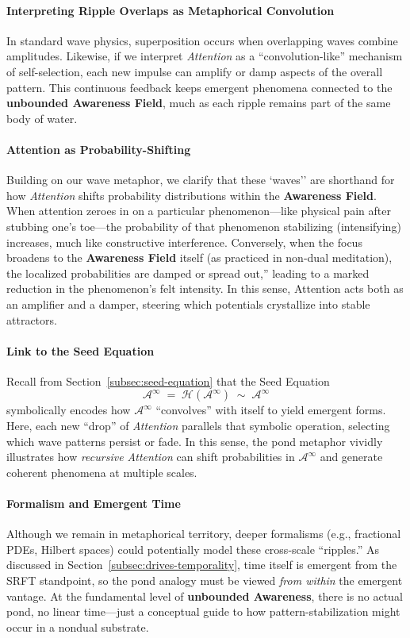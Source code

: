 \documentclass[12pt,a4paper]{article}
\begin{document}
\paragraph{Interpreting Ripple Overlaps as Metaphorical Convolution}
In standard wave physics, superposition occurs when overlapping waves combine amplitudes. 
Likewise, if we interpret \emph{Attention} as a “convolution-like” mechanism of self-selection, 
each new impulse can amplify or damp aspects of the overall pattern. This continuous feedback 
keeps emergent phenomena connected to the \textbf{unbounded Awareness Field}, much as each ripple 
remains part of the same body of water. 

\paragraph{Attention as Probability-Shifting}
Building on our wave metaphor, we clarify that these `waves'' are shorthand for how \emph{Attention} shifts probability distributions within the \textbf{Awareness Field}. When attention zeroes in on a particular phenomenon---like physical pain after stubbing one’s toe---the probability of that phenomenon stabilizing (intensifying) increases, much like constructive interference. Conversely, when the focus broadens to the \textbf{Awareness Field} itself (as practiced in non-dual meditation), the localized probabilities are damped or spread out,'' leading to a marked reduction in the phenomenon’s felt intensity. In this sense, Attention acts both as an amplifier and a damper, steering which potentials crystallize into stable attractors.

\paragraph{Link to the Seed Equation}
Recall from Section~\ref{subsec:seed-equation} that the Seed Equation 
\[
\mathscr{A}^\infty \;=\; \mathcal{H}(\mathscr{A}^\infty) \;\sim\; \mathscr{A}^\infty
\]
symbolically encodes how $\mathscr{A}^\infty$ “convolves” with itself to yield emergent forms. 
Here, each new “drop” of \emph{Attention} parallels that symbolic operation, selecting which 
wave patterns persist or fade. In this sense, the pond metaphor vividly illustrates how 
\emph{recursive Attention} can shift probabilities in $\mathscr{A}^\infty$ and generate 
coherent phenomena at multiple scales.

\paragraph{Formalism and Emergent Time}
Although we remain in metaphorical territory, deeper formalisms (e.g., fractional PDEs, 
Hilbert spaces) could potentially model these cross-scale “ripples.” As discussed in Section~\ref{subsec:drives-temporality}, time itself is emergent from the SRFT standpoint, so the pond analogy must be 
viewed \emph{from within} the emergent vantage. At the fundamental level of \textbf{unbounded 
Awareness}, there is no actual pond, no linear time—just a conceptual guide to how 
pattern-stabilization might occur in a nondual substrate.
\end{document}
